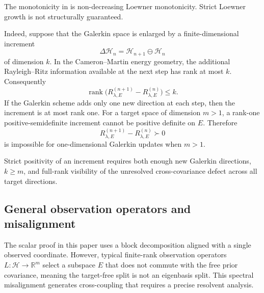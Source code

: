 \begin{remark}
\label{rem:strict_monotonicity}
The monotonicity in  is non-decreasing
Loewner monotonicity.  Strict Loewner growth is not structurally
guaranteed.

Indeed, suppose that the Galerkin space is enlarged by a finite-dimensional
increment
\[
  \Delta\mathcal H_n
  =
  \mathcal H_{n+1}\ominus\mathcal H_n
\]
of dimension $k$.  In the Cameron--Martin energy geometry, the additional
Rayleigh--Ritz information available at the next step has rank at most
$k$.  Consequently
\[
  \operatorname{rank}
  \bigl(R_{\lambda,E}^{(n+1)}-R_{\lambda,E}^{(n)}\bigr)
  \le k .
\]
If the Galerkin scheme adds only one new direction at each step, then the
increment is at most rank one.  For a target space of dimension $m>1$, a
rank-one positive-semidefinite increment cannot be positive definite on
$E$.  Therefore
\[
  R_{\lambda,E}^{(n+1)}-R_{\lambda,E}^{(n)}\succ0
\]
is impossible for one-dimensional Galerkin updates when $m>1$.

Strict positivity of an increment requires both enough new Galerkin
directions, $k\ge m$, and full-rank visibility of the unresolved
cross-covariance defect across all target directions.
\end{remark}

\subsection{General observation operators and misalignment}
\label{sec:discussion:misalignment}

The scalar proof in this paper uses a block decomposition aligned with a single observed coordinate. However, typical finite-rank observation operators $L:\mathcal H\to\mathbb R^m$ select a subspace $E$ that does not commute with the free prior covariance, meaning the target-free split is not an eigenbasis split. This spectral misalignment generates cross-coupling that requires a precise resolvent analysis.

